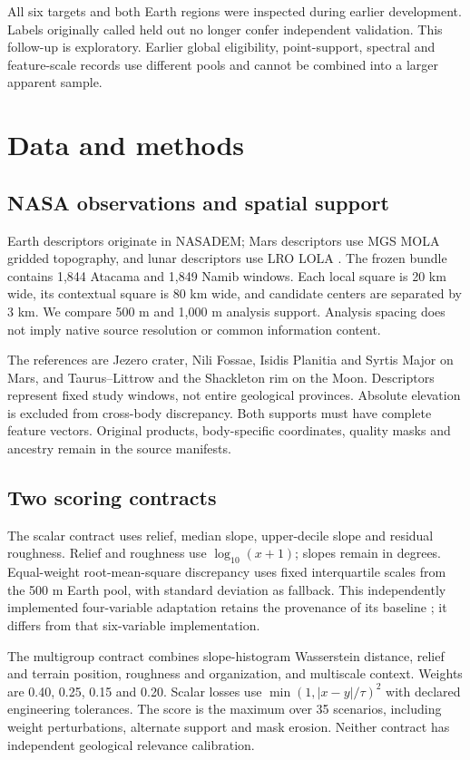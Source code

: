 All six targets and both Earth regions were inspected during earlier development. Labels originally called held out no longer confer independent validation. This follow-up is exploratory. Earlier global eligibility, point-support, spectral and feature-scale records use different pools and cannot be combined into a larger apparent sample.

\section{Data and methods}
\subsection{NASA observations and spatial support}
Earth descriptors originate in NASADEM; Mars descriptors use MGS MOLA gridded topography, and lunar descriptors use LRO LOLA \cite{nasadem,mola,lola}. The frozen bundle contains 1,844 Atacama and 1,849 Namib windows. Each local square is 20 km wide, its contextual square is 80 km wide, and candidate centers are separated by 3 km. We compare 500 m and 1,000 m analysis support. Analysis spacing does not imply native source resolution or common information content.

The references are Jezero crater, Nili Fossae, Isidis Planitia and Syrtis Major on Mars, and Taurus--Littrow and the Shackleton rim on the Moon. Descriptors represent fixed study windows, not entire geological provinces. Absolute elevation is excluded from cross-body discrepancy. Both supports must have complete feature vectors. Original products, body-specific coordinates, quality masks and ancestry remain in the source manifests.

\subsection{Two scoring contracts}
The scalar contract uses relief, median slope, upper-decile slope and residual roughness. Relief and roughness use $\log_{10}(x+1)$; slopes remain in degrees. Equal-weight root-mean-square discrepancy uses fixed interquartile scales from the 500 m Earth pool, with standard deviation as fallback. This independently implemented four-variable adaptation retains the provenance of its baseline \cite{terrainfinder}; it differs from that six-variable implementation.

The multigroup contract combines slope-histogram Wasserstein distance, relief and terrain position, roughness and organization, and multiscale context. Weights are 0.40, 0.25, 0.15 and 0.20. Scalar losses use $\min(1,|x-y|/\tau)^2$ with declared engineering tolerances. The score is the maximum over 35 scenarios, including weight perturbations, alternate support and mask erosion. Neither contract has independent geological relevance calibration.


